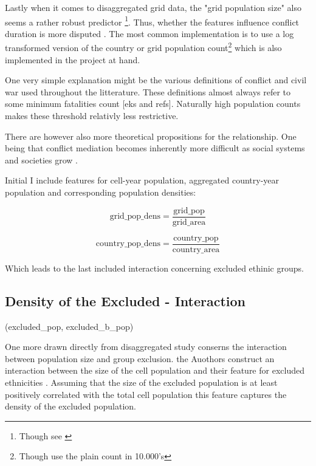 \documentclass[a4paper]{article}
\begin{document}
Lastly when it comes to disaggregated grid data, the "grid population size" also seems a rather robust predictor \citep{Buhaug_2010, Cederman_Gleditsch_Buhaug_2013}\footnote{Though see \cite{Hegre_Oestby_Raleigh_2009}}. Thus, whether the features influence conflict duration is more disputed \citep{Collier_Hoeffler_1998, Fearon_2004}. The most common implementation is to use a log transformed version of the country or grid population count\footnote{Though \cite{Collier_Hoeffler_1998} use the plain count in 10.000's} which is also implemented in the project at hand.\par


One very simple explanation might be the various definitions of conflict and civil war used throughout the litterature. These definitions almost always refer to some minimum fatalities count [eks and refs]. Naturally high population counts makes these threshold relativly less restrictive.\par

There are however also more theoretical propositions for the relationship. One being that conflict mediation becomes inherently more difficult as social systems and societies grow \cite[p- 271-272]{Diamond_1998}.\par

Initial I include features for cell-year population, aggregated country-year population and corresponding population densities:

$$\textrm{grid\_pop\_dens} = \frac{\textrm{grid\_pop}}{\textrm{grid\_area}}$$

$$\textrm{country\_pop\_dens} = \frac{\textrm{country\_pop}}{\textrm{country\_area}}$$

Which leads to the last included interaction concerning excluded ethinic groups.\par 

\subsection{Density of the Excluded - Interaction} %

(excluded\_pop, excluded\_b\_pop) 

One more drawn directly from \cite{Cederman_Gleditsch_Buhaug_2013} disaggregated study conserns the interaction between population size and group exclusion. the Auothors construct an interaction between the size of the cell population and their feature for excluded ethnicities \citep[73-78]{Cederman_Gleditsch_Buhaug_2013}. Assuming that the size of the excluded population is at least positively correlated with the total cell population this feature captures the density of the excluded population. 
\end{document}
